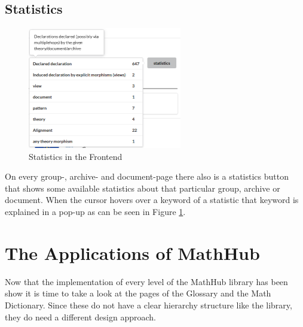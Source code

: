 \documentclass[11pt,a4paper]{article}
\begin{document}
\subsection{Statistics}
\begin{figure}[H]
\centerline{\includegraphics[width=0.6\textwidth]{statistics.png}}
\caption{Statistics in the Frontend}
\label{fig:stats}
\end{figure}
On every group-, archive- and document-page there also is a statistics button that shows some available statistics about that particular group, archive or document.
When the cursor hovers over a keyword of a statistic that keyword is explained in a pop-up as can be seen in Figure \ref{fig:stats}.

\section{The Applications of MathHub} \label{apps}
Now that the implementation of every level of the MathHub library has been show it is time to take a look at the pages of the Glossary and the Math Dictionary. 
Since these do not have a clear hierarchy structure like the library, they do need a different design approach.
\end{document}
